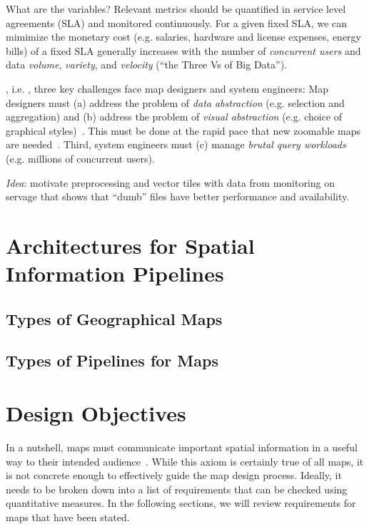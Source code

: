 \documentclass[11pt, oneside]{report}   	%
\begin{document}
What are the variables? Relevant metrics should be quantified in service level agreements (SLA) and monitored continuously. For a given fixed SLA, we can mimimize the monetary cost (e.g. salaries, hardware and license expenses, energy bills) of a fixed SLA generally increases with the number of \emph{concurrent users} and data \emph{volume}, \emph{variety}, and \emph{velocity} (``the Three Vs of Big Data'').



, i.e. , three key challenges face map designers and system engineers: Map designers must (a) address the problem of \emph{data abstraction} (e.g. selection and aggregation) and (b) address the problem of  \emph{visual abstraction} (e.g. choice of graphical styles)~\cite{stolte2003multiscale}. This must be done at the rapid pace that new zoomable maps are needed~\cite{lomet2012warstories}. Third, system engineers must (c) manage \emph{brutal query workloads} (e.g. millions of concurrent users).

\emph{Idea}: motivate preprocessing and vector tiles with data from monitoring on servage that shows that ``dumb'' files have better performance and availability.

\section{Architectures for Spatial Information Pipelines}

\subsection{Types of Geographical Maps}

\subsection{Types of Pipelines for Maps}

\section{Design Objectives}
In a nutshell, maps must communicate important spatial information in a useful way to their intended audience~\cite{robinson1982early}. While this axiom is certainly true of all maps, it is not concrete enough to effectively guide the map design process. Ideally, it needs to be broken down into a list of requirements that can be checked using quantitative measures. In the following sections, we will review requirements for maps that have been stated.
\end{document}

